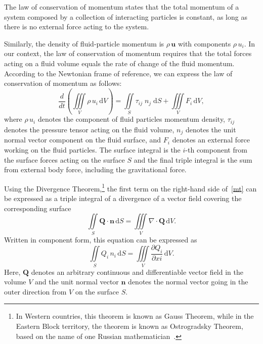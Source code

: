 \documentclass[12pt,a4paper]{report}
\begin{document}
The law of conservation of momentum states that the total momentum of a system composed by a collection of interacting particles is constant, as long as there is no external force acting to the system.

Similarly, the density of fluid-particle momentum is $\rho\,\mathbf{u}$ with components $\rho\,u_{i}$.
In our context, the law of conservation of momentum requires that the total forces acting on a fluid volume equals the rate of change of the fluid momentum.
According to the Newtonian frame of reference, we can express the law of conservation of momentum as follows:
\begin{equation}
\frac{d}{dt}\left(\iiint\limits_{V} \rho \, u_i \, \mathrm{d}V \right) = \iint\limits_{S} \tau_{ij} \; n_{j} \; \mathrm{d}S + \iiint\limits_{V} F_i \, \mathrm{d}V, \label{mt}
\end{equation}
where $\rho\,u_{i}$ denotes the component of fluid particles momentum density, $\tau_{ij}$ denotes the pressure tensor acting on the fluid volume, $n_{j}$ denotes the unit normal vector component on the fluid surface, and $F_{i}$ denotes an external force working on the fluid particles. The surface integral is the $i$-th component from the surface forces acting on the surface $S$ and the final triple integral is the sum from external body force, including the gravitational force.

Using the Divergence Theorem,\footnote[1]{In Western countries, this theorem is known as Gauss Theorem, while in the Eastern Block territory, the theorem is known as Ostrogradsky Theorem, based on the name of one Russian mathematician~\cite{tgb}.} the first term on the right-hand side of~\eqref{mt} can be expressed as a triple integral of a divergence of a vector field covering the corresponding surface
\begin{equation}
\iint\limits_{S} \mathbf{Q}\cdot\mathbf{n} \, \mathrm{d}S = \iiint\limits_{V} \nabla \cdot \mathbf{Q} \, \mathrm{d}V.  \label{tdg}
\end{equation}
Written in component form, this equation can be expressed as
\begin{equation}
\iint\limits_{S} Q_{i} \, n_{i} \, \mathrm{d}S = \iiint\limits_{V} \frac{\partial Q_{i}}{\partial x{i}} \, \mathrm{d}V.  \label{td}
\end{equation}
Here, $\mathbf{Q}$ denotes an arbitrary continuous and differentiable vector field in the volume $V$ and the unit normal vector $\mathbf{n}$ denotes the normal vector going in the outer direction from $V$ on the surface $S$.
\end{document}
